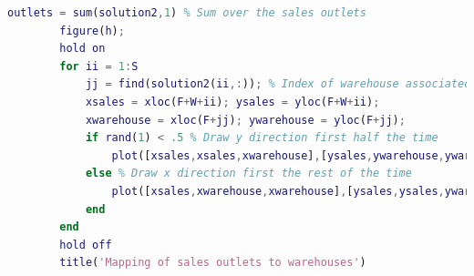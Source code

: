 \begin{lstlisting}[language = Matlab]
        outlets = sum(solution2,1) % Sum over the sales outlets
        figure(h);
        hold on
        for ii = 1:S
            jj = find(solution2(ii,:)); % Index of warehouse associated with ii
            xsales = xloc(F+W+ii); ysales = yloc(F+W+ii);
            xwarehouse = xloc(F+jj); ywarehouse = yloc(F+jj);
            if rand(1) < .5 % Draw y direction first half the time
                plot([xsales,xsales,xwarehouse],[ysales,ywarehouse,ywarehouse],'g--')
            else % Draw x direction first the rest of the time
                plot([xsales,xwarehouse,xwarehouse],[ysales,ysales,ywarehouse],'g--')
            end
        end
        hold off
        title('Mapping of sales outlets to warehouses')
        \end{lstlisting}
% 
